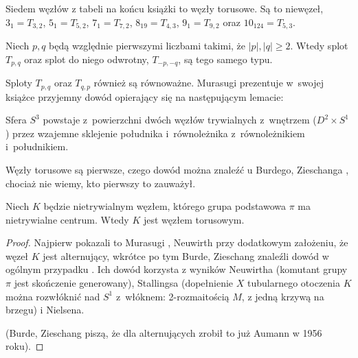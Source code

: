 Siedem węzłów z tabeli na końcu książki to węzły torusowe.
Są to niewęzeł, $3_1 = T_{3,2}$, $5_1 = T_{5,2}$, $7_1 = T_{7,2}$, $8_{19} = T_{4,3}$, $9_1 = T_{9,2}$ oraz $10_{124} = T_{5, 3}$.

\begin{proposition}
    Niech $p, q$ będą względnie pierwszymi liczbami takimi, że $|p|, |q| \ge 2$.
    Wtedy splot $T_{p, q}$ oraz splot do niego odwrotny, $T_{-p, -q}$, są tego samego typu.
\end{proposition}

Sploty $T_{p, q}$ oraz $T_{q, p}$ również są równoważne.
Murasugi prezentuje w~swojej książce \cite{murasugi1996} przyjemny dowód opierający się na następującym lemacie:

\begin{lemma}
    Sfera $S^3$ powstaje z~powierzchni dwóch węzłów trywialnych z~wnętrzem ($D^2 \times S^1$) przez wzajemne sklejenie południka i~równoleżnika z~równoleżnikiem i~południkiem.
\end{lemma}

Węzły torusowe są pierwsze, czego dowód można znaleźć u Burdego, Zieschanga \cite[s. 95]{burde2014}, chociaż nie wiemy, kto pierwszy to zauważył.

\begin{proposition}
\label{prp:torus_nontrivial_center}
    Niech $K$ będzie nietrywialnym węzłem, którego grupa podstawowa $\pi$ ma nietrywialne centrum.
    Wtedy $K$ jest węzłem torusowym.
\end{proposition}

\begin{proof}
%
%
%
%
%
%
    Najpierw pokazali to Murasugi \cite{murasugi1961}, Neuwirth \cite{neuwirth1961} przy dodatkowym założeniu, że węzeł $K$ jest alternujący,
    wkrótce po tym Burde, Zieschang znaleźli dowód w ogólnym przypadku \cite{zieschang1966}.
    Ich dowód korzysta z wyników Neuwirtha (komutant grupy $\pi$ jest skończenie generowany), Stallingsa (dopełnienie $X$ tubularnego otoczenia $K$ można rozwłóknić nad $S^1$ z~włóknem: 2-rozmaitością $M$, z jedną krzywą na brzegu) i Nielsena.

    (Burde, Zieschang piszą, że dla alternujących zrobił to już Aumann \cite{aumann1956} w 1956 roku).
\end{proof}

